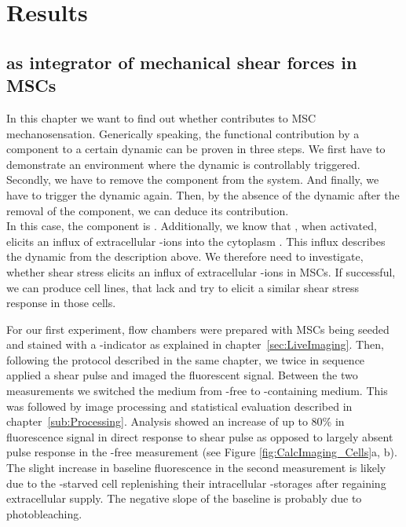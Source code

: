 \chapter{Results}



\section{\Piezo{} as integrator of mechanical shear forces in MSCs}
\label{sec:piezo1-as-integrator-of-biomecshanical-events-in-mscs}


In this chapter we want to find out whether \Piezo{} contributes to MSC mechanosensation. Generically speaking, the functional contribution by a component to a certain dynamic can be proven in three steps. We first have to demonstrate an environment where the dynamic is controllably triggered. Secondly, we have to remove the component from the system. And finally, we have to trigger the dynamic again. Then, by the absence of the dynamic after the removal of the component, we can deduce its contribution. \\
In this case, the component is \Piezo{}. Additionally, we know that \Piezo{}, when activated, elicits an influx of extracellular \calcium{}-ions into the cytoplasm \cite{Coste2010}. This influx describes the dynamic from the description above. We therefore need to investigate, whether shear stress elicits an influx of extracellular \calcium{}-ions in MSCs. If successful, we can produce cell lines, that lack \Piezo{} and try to elicit a similar shear stress response in those cells.

For our first experiment, flow chambers were prepared with MSCs being seeded and stained with a \calcium{}-indicator as explained in chapter~\vref{sec:LiveImaging}. Then, following the protocol described in the same chapter, we twice in sequence applied a shear pulse and imaged the fluorescent signal. Between the two measurements we switched the medium from \calcium{}-free to \calcium-containing medium. This was followed by image processing and statistical evaluation described in chapter~\ref{sub:Processing}. Analysis showed an increase of up to 80\% in fluorescence signal in direct response to shear pulse as opposed to largely absent pulse response in the \calcium{}-free measurement (see Figure \ref{fig:CalcImaging_Cells}a, b). The slight increase in baseline fluorescence in the second  measurement is likely due to the \calcium{}-starved cell replenishing their intracellular \calcium{}-storages after regaining extracellular supply. The negative slope of the baseline is probably due to photobleaching.

